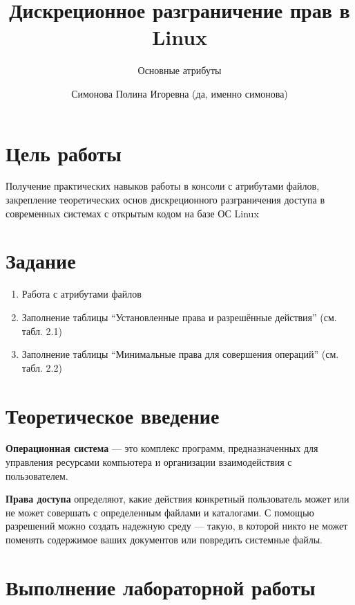 \documentclass[
  12pt,
  a4paper,
  DIV=11,
  numbers=noendperiod]{scrreprt}
\title{Дискреционное разграничение прав в Linux}
\subtitle{Основные атрибуты}
\author{Симонова Полина Игоревна (да, именно симонова)}
\date{}
\providecommand{\tightlist}{%
  \setlength{\itemsep}{0pt}\setlength{\parskip}{0pt}}\usepackage{longtable,booktabs,array}
\renewcommand*\contentsname{Содержание}
\newcommand\contentsname{Содержание}
\begin{document}
\maketitle

\renewcommand*\contentsname{Содержание}
{
\setcounter{tocdepth}{1}
\tableofcontents
}
\listoffigures
\listoftables

\chapter{Цель
работы}\label{ux446ux435ux43bux44c-ux440ux430ux431ux43eux442ux44b}

Получение практических навыков работы в консоли с атрибутами файлов,
закрепление теоретических основ дискреционного разграничения доступа в
современных системах с открытым кодом на базе ОС Linux

\chapter{Задание}\label{ux437ux430ux434ux430ux43dux438ux435}

\begin{enumerate}
\def\labelenumi{\arabic{enumi}.}
\tightlist
\item
  Работа с атрибутами файлов
\item
  Заполнение таблицы \enquote{Установленные права и разрешённые
  действия} (см. табл. 2.1)
\item
  Заполнение таблицы \enquote{Минимальные права для совершения операций}
  (см. табл. 2.2)
\end{enumerate}

\chapter{Теоретическое
введение}\label{ux442ux435ux43eux440ux435ux442ux438ux447ux435ux441ux43aux43eux435-ux432ux432ux435ux434ux435ux43dux438ux435}

\textbf{Операционная система} --- это комплекс программ, предназначенных
для управления ресурсами компьютера и организации взаимодействия с
пользователем.

\textbf{Права доступа} определяют, какие действия конкретный
пользователь может или не может совершать с определенным файлами и
каталогами. С помощью разрешений можно создать надежную среду --- такую,
в которой никто не может поменять содержимое ваших документов или
повредить системные файлы.

\chapter{Выполнение лабораторной
работы}\label{ux432ux44bux43fux43eux43bux43dux435ux43dux438ux435-ux43bux430ux431ux43eux440ux430ux442ux43eux440ux43dux43eux439-ux440ux430ux431ux43eux442ux44b}
\end{document}
